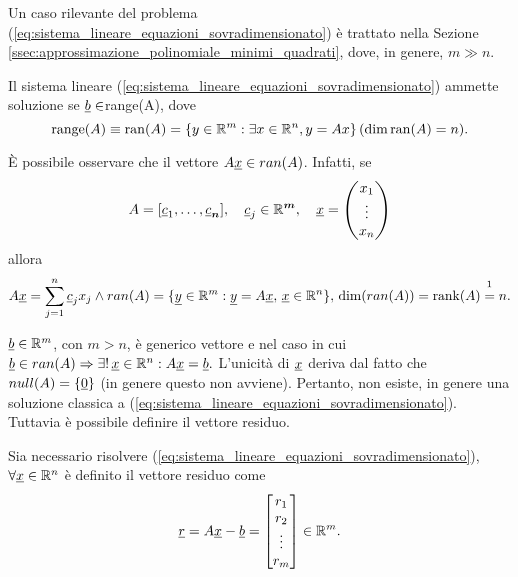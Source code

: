 Un caso rilevante del problema (\ref{eq:sistema_lineare_equazioni_sovradimensionato}) è trattato nella Sezione \ref{ssec:approssimazione_polinomiale_minimi_quadrati}, dove, in genere, $m\gg n$.

Il sistema lineare (\ref{eq:sistema_lineare_equazioni_sovradimensionato}) ammette soluzione se $\uline b\in$\gls{range(A)}, dove
\begin{equation*}
	\operatorname{range}(A)\equiv\operatorname{ran}(A)=\{y\in\mathbb R^m:\exists x\in\mathbb R^n, y=Ax\}\, (\dim\operatorname{ran}(A)=n).
\end{equation*}

È possibile osservare che il vettore $A\uline x\in ran(A)$. Infatti, se
\begin{equation*}
    A=[\uline c_1, \hdots,\uline c_{\boldsymbol n}],\quad \uline c_j\in\mathbb R^{\boldsymbol m},\quad \uline x=
    \begin{pmatrix}
        x_1\\
        \vdots\\
        x_n
    \end{pmatrix}
\end{equation*}
allora
\begin{equation*}
    A\uline x = \sum_{j=1}^n\uline c_j x_j\wedge ran(A)=\{\uline y\in\mathbb R^m:\uline y = A\uline x, \,\uline x\in\mathbb R^n\},\, \dim(ran(A))=\rank(A)\overset{\footnotemark}{=}n.
\end{equation*}

$\uline b\in\mathbb R^m$, con $m>n$, è generico vettore e nel caso in cui $\uline b\in ran(A)\Rightarrow\exists! \,\uline x\in\mathbb R^n:A\uline x=\uline b.$ L'unicità di $\uline x$ deriva dal fatto che $null(A)=\{\uline 0\}$ (in genere questo non avviene). Pertanto, non esiste, in genere una soluzione classica a (\ref{eq:sistema_lineare_equazioni_sovradimensionato}). Tuttavia è possibile definire il vettore residuo.

\begin{definition}
	Sia necessario risolvere (\ref{eq:sistema_lineare_equazioni_sovradimensionato}), $\forall \uline x \in\mathbb{R}^n$ è definito il vettore residuo come
	\begin{equation}\label{eq:vettore_residuo}
		\uline r = A\uline x-\uline b=
		\begin{bmatrix}
			r_1\\
			r_2\\
			\vdots\\
			r_m
		\end{bmatrix}
		\in\mathbb R^m.
	\end{equation}
\end{definition}

